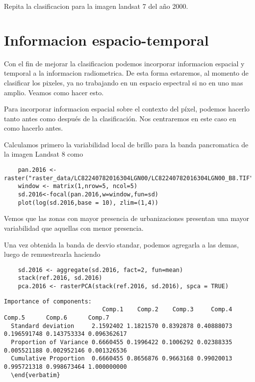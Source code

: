 \begin{act}
  Repita la clasificacion para la imagen landsat 7 del año 2000.
\end{act}


\section{Informacion espacio-temporal}
Con el fin de mejorar la clasificacion podemos incorporar informacion espacial y
temporal a la informacion radiometrica. De esta forma estaremos, al momento de
clasificar los pixeles, ya no trabajando en un espacio espectral si no en uno mas amplio. Veamos como hacer esto.

\begin{exa}
  Para incorporar informacion espacial sobre el contexto del p\'ixel, podemos
  hacerlo tanto antes como despu\'es de la clasificaci\'on. Nos centraremos
  en este caso en como hacerlo antes.

  Calculamos primero la variabilidad local de brillo para la banda pancromatica
  de la imagen Landsat 8 como

  \begin{lstlisting}
    pan.2016 <- raster("raster_data/LC82240782016304LGN00/LC82240782016304LGN00_B8.TIF")
    window <- matrix(1,nrow=5, ncol=5)
    sd.2016<-focal(pan.2016,w=window,fun=sd)
    plot(log(sd.2016,base = 10), zlim=(1,4))
  \end{lstlisting}

  Vemos que las zonas con mayor presencia de urbanizaciones presentan una mayor variabilidad que aquellas con menor presencia.

  Una vez obtenida la banda de desvio standar, podemos agregarla a las demas, luego
  de remuestrearla haciendo

  \begin{lstlisting}
    sd.2016 <- aggregate(sd.2016, fact=2, fun=mean)
    stack(ref.2016, sd.2016)
    pca.2016 <- rasterPCA(stack(ref.2016, sd.2016), spca = TRUE)
  \end{lstlisting}

  \begin{Verbatim}[fontsize=\small]
  Importance of components:
                            Comp.1    Comp.2    Comp.3     Comp.4      Comp.5      Comp.6      Comp.7
  Standard deviation     2.1592402 1.1821570 0.8392878 0.40888073 0.196591748 0.143753334 0.096362617
  Proportion of Variance 0.6660455 0.1996422 0.1006292 0.02388335 0.005521188 0.002952146 0.001326536
  Cumulative Proportion  0.6660455 0.8656876 0.9663168 0.99020013 0.995721318 0.998673464 1.000000000
  \end{verbatim}


\end{Verbatim}
\end{exa}
